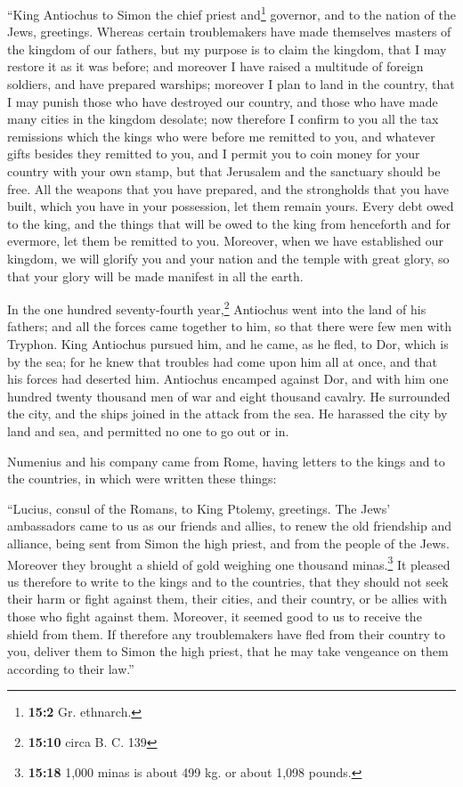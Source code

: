 ``King Antiochus to Simon the chief priest and\footnote{\textbf{15:2}
  Gr. ethnarch.} governor, and to the nation of the Jews, greetings.
 Whereas certain troublemakers have made themselves
masters of the kingdom of our fathers, but my purpose is to claim the
kingdom, that I may restore it as it was before; and moreover I have
raised a multitude of foreign soldiers, and have prepared warships;
 moreover I plan to land in the country, that I may punish
those who have destroyed our country, and those who have made many
cities in the kingdom desolate;  now therefore I confirm
to you all the tax remissions which the kings who were before me
remitted to you, and whatever gifts besides they remitted to you,
 and I permit you to coin money for your country with your
own stamp,  but that Jerusalem and the sanctuary should be
free. All the weapons that you have prepared, and the strongholds that
you have built, which you have in your possession, let them remain
yours.  Every debt owed to the king, and the things that
will be owed to the king from henceforth and for evermore, let them be
remitted to you.  Moreover, when we have established our
kingdom, we will glorify you and your nation and the temple with great
glory, so that your glory will be made manifest in all the earth.

 In the one hundred seventy-fourth year,\footnote{\textbf{15:10}
  circa B. C. 139} Antiochus went into the land of his fathers; and all
the forces came together to him, so that there were few men with
Tryphon.  King Antiochus pursued him, and he came, as he
fled, to Dor, which is by the sea;  for he knew that
troubles had come upon him all at once, and that his forces had deserted
him.  Antiochus encamped against Dor, and with him one
hundred twenty thousand men of war and eight thousand cavalry.
 He surrounded the city, and the ships joined in the
attack from the sea. He harassed the city by land and sea, and permitted
no one to go out or in.

 Numenius and his company came from Rome, having letters
to the kings and to the countries, in which were written these things:

 ``Lucius, consul of the Romans, to King Ptolemy,
greetings.  The Jews' ambassadors came to us as our
friends and allies, to renew the old friendship and alliance, being sent
from Simon the high priest, and from the people of the Jews.
 Moreover they brought a shield of gold weighing one
thousand minas.\footnote{\textbf{15:18} 1,000 minas is about 499 kg. or
  about 1,098 pounds.}  It pleased us therefore to write
to the kings and to the countries, that they should not seek their harm
or fight against them, their cities, and their country, or be allies
with those who fight against them.  Moreover, it seemed
good to us to receive the shield from them.  If therefore
any troublemakers have fled from their country to you, deliver them to
Simon the high priest, that he may take vengeance on them according to
their law.''


